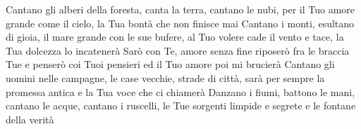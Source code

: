 \beginverse
Cantano gli alberi della foresta,
canta la terra, cantano le nubi,
per il Tuo amore grande come il cielo,
la Tua bontà che non finisce mai
Cantano i monti, esultano di gioia,
il mare grande con le sue bufere,
al Tuo volere cade il vento e tace,
la Tua dolcezza lo incatenerà
\endverse
\beginchorus
Sarò con Te, amore senza fine
riposerò fra le braccia Tue
e penserò coi Tuoi pensieri
ed il Tuo amore poi mi brucierà
\endchorus
\beginverse
Cantano gli uomini nelle campagne,
le case vecchie, strade di città,
sarà per sempre la promessa antica
e la Tua voce che ci chiamerà
Danzano i fiumi, battono le mani,
cantano le acque, cantano i ruscelli,
le Tue sorgenti limpide e segrete
e le fontane della verità
\endverse
\endsong
